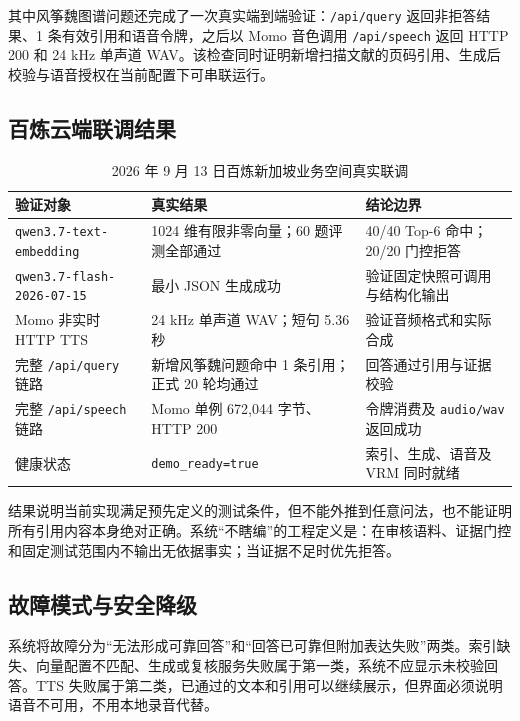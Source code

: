 \documentclass[UTF8,zihao=-4,fontset=none,twoside]{ctexart}
\newcommand{\code}[1]{\mbox{\texttt{#1}}\nobreak}
\begin{document}
其中风筝魏图谱问题还完成了一次真实端到端验证：\code{/api/query} 返回非拒答结果、1 条有效引用和语音令牌，之后以 Momo 音色调用 \code{/api/speech} 返回 HTTP 200 和 24 kHz 单声道 WAV。该检查同时证明新增扫描文献的页码引用、生成后校验与语音授权在当前配置下可串联运行。

\subsection{百炼云端联调结果}

\begin{table}[htbp]
\centering
\caption{2026 年 9 月 13 日百炼新加坡业务空间真实联调}
\label{tab:cloud-results}
\begin{tabularx}{\linewidth}{@{}P{43mm}Y Y@{}}
\toprule
验证对象 & 真实结果 & 结论边界 \\
\midrule
\code{qwen3.7-text-}\newline\code{embedding} & 1024 维有限非零向量；60 题评测全部通过 & 40/40 Top-6 命中；20/20 门控拒答 \\
\code{qwen3.7-flash-}\newline\code{2026-07-15} & 最小 JSON 生成成功 & 验证固定快照可调用与结构化输出 \\
Momo 非实时 HTTP TTS & 24 kHz 单声道 WAV；短句 5.36 秒 & 验证音频格式和实际合成 \\
完整 \code{/api/query} 链路 & 新增风筝魏问题命中 1 条引用；正式 20 轮均通过 & 回答通过引用与证据校验 \\
完整 \code{/api/speech} 链路 & Momo 单例 672,044 字节、HTTP 200 & 令牌消费及 \code{audio/wav} 返回成功 \\
健康状态 & \code{demo\_ready=true} & 索引、生成、语音及 VRM 同时就绪 \\
\bottomrule
\end{tabularx}
\end{table}

结果说明当前实现满足预先定义的测试条件，但不能外推到任意问法，也不能证明所有引用内容本身绝对正确。系统“不瞎编”的工程定义是：在审核语料、证据门控和固定测试范围内不输出无依据事实；当证据不足时优先拒答。

\subsection{故障模式与安全降级}

系统将故障分为“无法形成可靠回答”和“回答已可靠但附加表达失败”两类。索引缺失、向量配置不匹配、生成或复核服务失败属于第一类，系统不应显示未校验回答。TTS 失败属于第二类，已通过的文本和引用可以继续展示，但界面必须说明语音不可用，不用本地录音代替。
\end{document}
